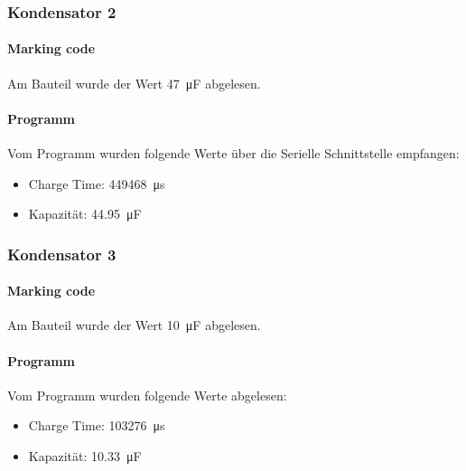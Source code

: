 \subsubsection{Kondensator 2}

\paragraph{Marking code} Am Bauteil wurde der Wert \SI{47}{\micro\farad} abgelesen.

\paragraph{Programm} Vom Programm wurden folgende Werte über die Serielle Schnittstelle empfangen:

\begin{itemize}
    \item Charge Time: \SI{449468}{\micro\second}
    \item Kapazität: \SI{44.95}{\micro\farad}
\end{itemize}

\subsubsection{Kondensator 3}

\paragraph{Marking code} Am Bauteil wurde der Wert \SI{10}{\micro\farad} abgelesen.

\paragraph{Programm} Vom Programm wurden folgende Werte abgelesen:

\begin{itemize}
    \item Charge Time: \SI{103276}{\micro\second}
    \item Kapazität: \SI{10.33}{\micro\farad}
\end{itemize}